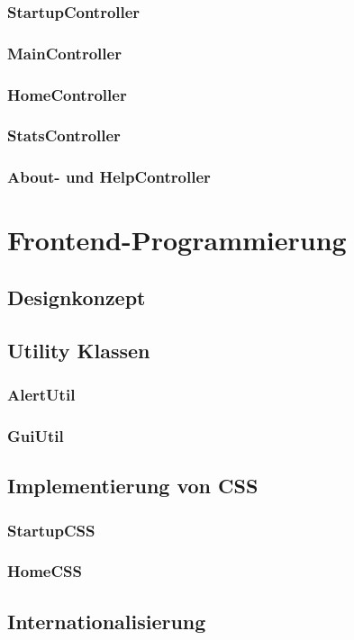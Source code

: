 \subsubsection{StartupController}
\subsubsection{MainController}
\subsubsection{HomeController}
\subsubsection{StatsController}
\subsubsection{About- und HelpController}
\section{Frontend-Programmierung}
\subsection{Designkonzept}
\subsection{Utility Klassen}
\subsubsection{AlertUtil}
\subsubsection{GuiUtil}
\subsection{Implementierung von CSS}
\subsubsection{StartupCSS}
\subsubsection{HomeCSS}
\subsection{Internationalisierung}
